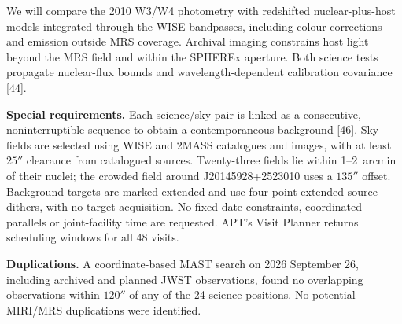 \documentclass[12pt]{article}
\begin{document}
We will compare the 2010 W3/W4 photometry with redshifted nuclear-plus-host models integrated through the WISE bandpasses, including colour corrections and emission outside MRS coverage. Archival imaging constrains host light beyond the MRS field and within the SPHEREx aperture. Both science tests propagate nuclear-flux bounds and wavelength-dependent calibration covariance [44].

\clearpage
\supplementalinformation
\noindent\textbf{Special requirements.} Each science/sky pair is linked as a consecutive, noninterruptible sequence to obtain a contemporaneous background [46]. Sky fields are selected using WISE and 2MASS catalogues and images, with at least $25''$ clearance from catalogued sources. Twenty-three fields lie within 1--2~arcmin of their nuclei; the crowded field around J20145928+2523010 uses a $135''$ offset. Background targets are marked extended and use four-point extended-source dithers, with no target acquisition. No fixed-date constraints, coordinated parallels or joint-facility time are requested. APT's Visit Planner returns scheduling windows for all 48 visits.

\noindent\textbf{Duplications.} A coordinate-based MAST search on 2026 September 26, including archived and planned JWST observations, found no overlapping observations within $120''$ of any of the 24 science positions. No potential MIRI/MRS duplications were identified.
\end{document}
